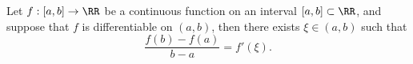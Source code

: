 

\begin{theorem}
Let $f:[a,b]\to\RR$ be a continuous function on an interval 
$[a,b]\subset\RR$, and suppose that $f$ is differentiable 
on $(a,b)$, then there exists $\xi\in (a,b)$ such that
$$
\frac{f(b)-f(a)}{b-a}=f'(\xi).
$$

\end{theorem}

